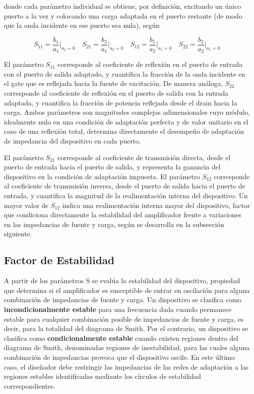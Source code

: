 donde cada parámetro individual se obtiene, por definición, excitando un único puerto a la vez y colocando una carga adaptada en el puerto restante (de modo que la onda incidente en ese puerto sea nula), según

\begin{equation}
    S_{11} = \frac{b_1}{a_1}\bigg|_{a_2 = 0} \quad
    S_{21} = \frac{b_2}{a_1}\bigg|_{a_2 = 0} \quad
    S_{12} = \frac{b_1}{a_2}\bigg|_{a_1 = 0} \quad
    S_{22} = \frac{b_2}{a_2}\bigg|_{a_1 = 0}
    \label{eq:definicion_s}
\end{equation}

El parámetro $S_{11}$ corresponde al coeficiente de reflexión en el puerto de entrada con el puerto de salida adaptado, y cuantifica la fracción de la onda incidente en el gate que es reflejada hacia la fuente de excitación. De manera análoga, $S_{22}$ corresponde al coeficiente de reflexión en el puerto de salida con la entrada adaptada, y cuantifica la fracción de potencia reflejada desde el drain hacia la carga. Ambos parámetros son magnitudes complejas adimensionales cuyo módulo, idealmente nulo en una condición de adaptación perfecta y de valor unitario en el caso de una reflexión total, determina directamente el desempeño de adaptación de impedancia del dispositivo en cada puerto.

El parámetro $S_{21}$ corresponde al coeficiente de transmisión directa, desde el puerto de entrada hacia el puerto de salida, y representa la ganancia del dispositivo en la condición de adaptación impuesta. El parámetro $S_{12}$ corresponde al coeficiente de transmisión inversa, desde el puerto de salida hacia el puerto de entrada, y cuantifica la magnitud de la realimentación interna del dispositivo. Un mayor valor de $S_{12}$ indica una realimentación interna mayor del dispositivo, factor que condiciona directamente la estabilidad del amplificador frente a variaciones en las impedancias de fuente y carga, según se desarrolla en la subsección siguiente.

\subsection{Factor de Estabilidad}
A partir de los parámetros S se evalúa la estabilidad del dispositivo, propiedad que determina si el amplificador es susceptible de entrar en oscilación para alguna combinación de impedancias de fuente y carga. Un dispositivo se clasifica como \textbf{incondicionalmente estable} para una frecuencia dada cuando permanece estable para cualquier combinación posible de impedancias de fuente y carga, es decir, para la totalidad del diagrama de Smith. Por el contrario, un dispositivo se clasifica como \textbf{condicionalmente estable} cuando existen regiones dentro del diagrama de Smith, denominadas regiones de inestabilidad, para las cuales alguna combinación de impedancias provoca que el dispositivo oscile. En este último caso, el diseñador debe restringir las impedancias de las redes de adaptación a las regiones estables identificadas mediante los círculos de estabilidad correspondientes.

